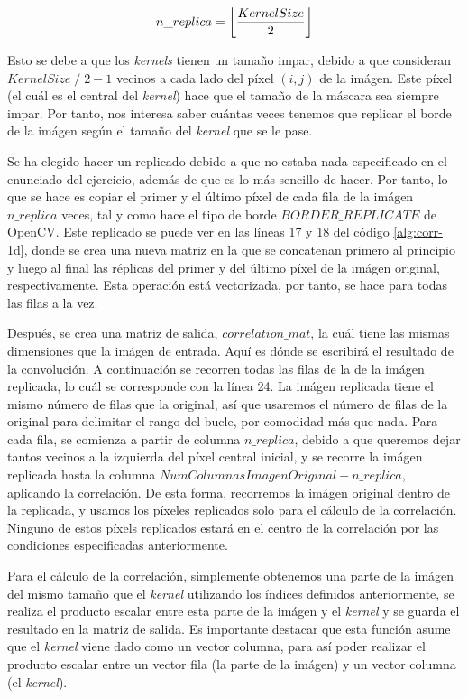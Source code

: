 \documentclass[11pt,a4paper]{article}
\DeclarePairedDelimiter\floor{\lfloor}{\rfloor}
\begin{document}
\begin{equation}
	n\_replica = \floor*{\frac{KernelSize}{2}}
\end{equation}

Esto se debe a que los \textit{kernels} tienen un tamaño impar, debido a que consideran $KernelSize \; / \; 2 - 1$ vecinos
a cada lado del píxel $(i, j)$ de la imágen. Este píxel (el cuál es el central del \textit{kernel}) hace que el tamaño
de la máscara sea siempre impar. Por tanto, nos interesa saber cuántas veces tenemos que replicar el borde de la imágen según el
tamaño del \textit{kernel} que se le pase.

Se ha elegido hacer un replicado debido a que no estaba nada especificado en el enunciado del ejercicio, además de que
es lo más sencillo de hacer. Por tanto, lo que se hace es copiar el primer y el último píxel de cada fila de la imágen
$n\_replica$ veces, tal y como hace el tipo de borde $BORDER\_REPLICATE$ de OpenCV. Este replicado se puede ver en las
líneas 17 y 18 del código \ref{alg:corr-1d}, donde se crea una nueva matriz en la que se concatenan primero al principio
y luego al final las réplicas del primer y del último píxel de la imágen original, respectivamente. Esta operación está
vectorizada, por tanto, se hace para todas las filas a la vez.

Después, se crea una matriz de salida, $correlation\_mat$, la cuál tiene las mismas dimensiones que la imágen de entrada.
Aquí es dónde se escribirá el resultado de la convolución. A continuación se recorren todas las filas de la de la imágen
replicada, lo cuál se corresponde con la línea 24. La imágen replicada tiene el mismo número de filas que la original, así que
usaremos el número de filas de la original para delimitar el rango del bucle, por comodidad más que nada. Para cada fila,
se comienza a partir de columna $n\_replica$, debido a que queremos dejar tantos vecinos a la izquierda del píxel
central inicial, y se recorre la imágen replicada hasta la columna $NumColumnasImagenOriginal + n\_replica$, aplicando
la correlación. De esta forma, recorremos la imágen original dentro de la replicada, y usamos los píxeles replicados solo
para el cálculo de la correlación. Ninguno de estos píxels replicados estará en el centro de la correlación por las condiciones
especificadas anteriormente.

Para el cálculo de la correlación, simplemente obtenemos una parte de la imágen del mismo tamaño que el \textit{kernel}
utilizando los índices definidos anteriormente, se realiza el producto escalar entre esta parte de la imágen y el \textit{kernel}
y se guarda el resultado en la matriz de salida. Es importante destacar que esta función asume que el \textit{kernel} viene
dado como un vector columna, para así poder realizar el producto escalar entre un vector fila (la parte de la imágen) y un
vector columna (el \textit{kernel}).
\end{document}
